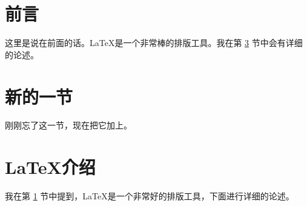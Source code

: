 \documentclass{ctexart}
\begin{document}
\section{前言}
\label{sec:introduction}
这里是说在前面的话。\LaTeX 是一个非常棒的排版工具。我在第 \ref{sec:detail} 节中会有详细的论述。
\section{新的一节}
刚刚忘了这一节，现在把它加上。
\section{\LaTeX 介绍}
\label{sec:detail}
我在第 \ref{sec:introduction} 节中提到，\LaTeX 是一个非常好的排版工具，下面进行详细的论述。
\end{document}

